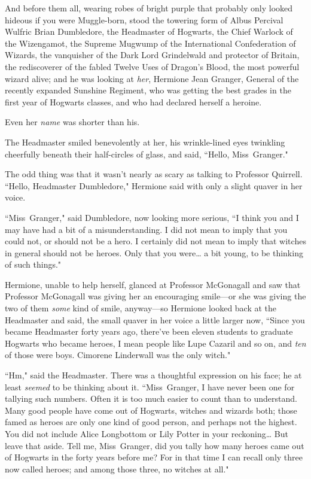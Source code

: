 And before them all, wearing robes of bright purple that probably only looked hideous if you were Muggle-born, stood the towering form of Albus Percival Wulfric Brian Dumbledore, the Headmaster of Hogwarts, the Chief Warlock of the Wizengamot, the Supreme Mugwump of the International Confederation of Wizards, the vanquisher of the Dark Lord Grindelwald and protector of Britain, the rediscoverer of the fabled Twelve Uses of Dragon's Blood, the most powerful wizard alive; and he was looking at \emph{her}, Hermione Jean Granger, General of the recently expanded Sunshine Regiment, who was getting the best grades in the first year of Hogwarts classes, and who had declared herself a heroine.

Even her \emph{name} was shorter than his.

The Headmaster smiled benevolently at her, his wrinkle-lined eyes twinkling cheerfully beneath their half-circles of glass, and said, ``Hello, Miss~Granger."

The odd thing was that it wasn't nearly as scary as talking to Professor Quirrell. ``Hello, Headmaster Dumbledore," Hermione said with only a slight quaver in her voice.

``Miss~Granger," said Dumbledore, now looking more serious, ``I think you and I may have had a bit of a misunderstanding. I did not mean to imply that you could not, or should not be a hero. I certainly did not mean to imply that witches in general should not be heroes. Only that you were{\ldots} a bit young, to be thinking of such things."

Hermione, unable to help herself, glanced at Professor McGonagall and saw that Professor McGonagall was giving her an encouraging smile---or she was giving the two of them \emph{some} kind of smile, anyway---so Hermione looked back at the Headmaster and said, the small quaver in her voice a little larger now, ``Since you became Headmaster forty years ago, there've been eleven students to graduate Hogwarts who became heroes, I mean people like Lupe Cazaril and so on, and \emph{ten} of those were boys. Cimorene Linderwall was the only witch."

``Hm," said the Headmaster. There was a thoughtful expression on his face; he at least \emph{seemed} to be thinking about it. ``Miss~Granger, I have never been one for tallying such numbers. Often it is too much easier to count than to understand. Many good people have come out of Hogwarts, witches and wizards both; those famed as heroes are only one kind of good person, and perhaps not the highest. You did not include Alice Longbottom or Lily Potter in your reckoning{\ldots} But leave that aside. Tell me, Miss~Granger, did you tally how many heroes came out of Hogwarts in the forty years before me? For in that time I can recall only three now called heroes; and among those three, no witches at all."

